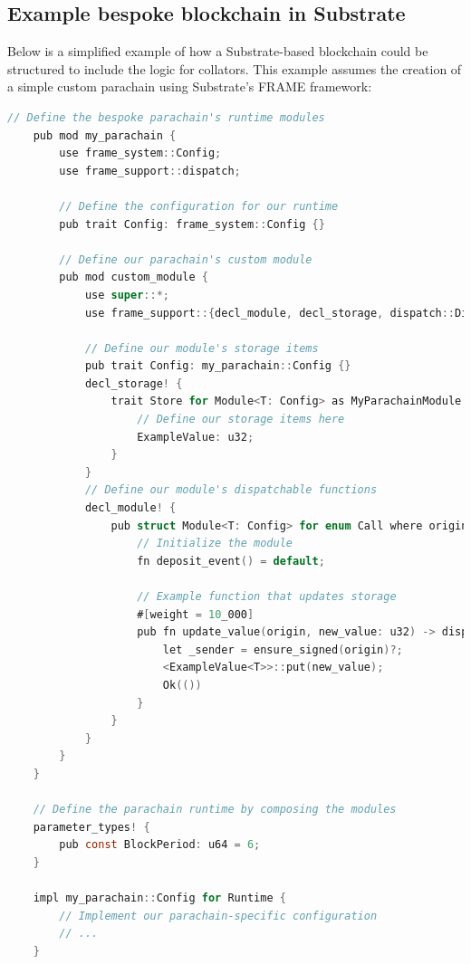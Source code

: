 \documentclass{tufte-handout}
\begin{document}
\subsection{Example bespoke blockchain in Substrate}\label{sec:headings}
Below is a simplified example of how a Substrate-based blockchain could be structured to include the logic for collators. This example assumes the creation of a simple
custom parachain using Substrate's FRAME framework:

\begin{lstlisting}[language=C, caption=FRAME framework example]
    // Define the bespoke parachain's runtime modules
    pub mod my_parachain {
        use frame_system::Config;
        use frame_support::dispatch;
        
        // Define the configuration for our runtime
        pub trait Config: frame_system::Config {}
        
        // Define our parachain's custom module
        pub mod custom_module {
            use super::*;
            use frame_support::{decl_module, decl_storage, dispatch::DispatchResult};
            
            // Define our module's storage items
            pub trait Config: my_parachain::Config {}
            decl_storage! {
                trait Store for Module<T: Config> as MyParachainModule {
                    // Define our storage items here
                    ExampleValue: u32;
                }
            }    
            // Define our module's dispatchable functions
            decl_module! {
                pub struct Module<T: Config> for enum Call where origin: T::Origin {
                    // Initialize the module
                    fn deposit_event() = default;
                    
                    // Example function that updates storage
                    #[weight = 10_000]
                    pub fn update_value(origin, new_value: u32) -> dispatch::DispatchResult {
                        let _sender = ensure_signed(origin)?;
                        <ExampleValue<T>>::put(new_value);
                        Ok(())
                    }
                }
            }
        }
    }
    
    // Define the parachain runtime by composing the modules
    parameter_types! {
        pub const BlockPeriod: u64 = 6;
    }
    
    impl my_parachain::Config for Runtime {
        // Implement our parachain-specific configuration
        // ...
    }
    

\end{lstlisting}
\end{document}
